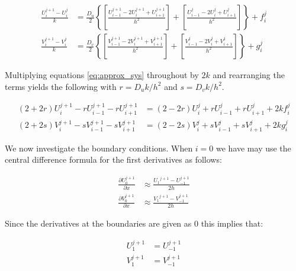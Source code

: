 \begin{subequations} \label{eq:approx_sys}
\begin{align}
    \frac{U_{i}^{j+1} - U_{i}^{j}}{k} &=
        \frac{D_u}{2} \left\{
            \left[ \frac{U_{i-1}^{j+1}-2U_{i}^{j+1}+U_{i+1}^{j+1}}{h^2} \right] +
            \left[ \frac{U_{i-1}^{j}-2U_{i}^{j}+U_{i+1}^{j}}{h^2} \right]
        \right\} + f_{i}^{j} \label{eq:approx_prey}
        \\
    \frac{V_{i}^{j+1} - V_{i}^{j}}{k} &=
        \frac{D_v}{2} \left\{
            \left[ \frac{V_{i-1}^{j+1}-2V_{i}^{j+1}+V_{i+1}^{j+1}}{h^2} \right] +
            \left[ \frac{V_{i-1}^{j}-2V_{i}^{j}+V_{i+1}^{j}}{h^2} \right]
        \right\} + g_{i}^{j} \label{eq:approx_pred}
\end{align}
\end{subequations}

Multiplying equations \eqref{eq:approx_sys} throughout by $2k$ and rearranging
the terms yields the following with $r = D_u k / h^2$ and $s = D_v k / h^2$.

\begin{subequations} \label{eq:rearranged_approx_sys}
\begin{align}
    (2+2r) U_{i}^{j+1} - r U_{i-1}^{j+1} - r U_{i+1}^{j+1} &=
        (2-2r) U_{i}^{j} + r U_{i-1}^{j} + r U_{i+1}^{j} + 2k f_{i}^{j}
        \\
    (2+2s) V_{i}^{j+1} - s V_{i-1}^{j+1} - s V_{i+1}^{j+1} &=
        (2-2s) V_{i}^{j} + s V_{i-1}^{j} + s V_{i+1}^{j} + 2k g_{i}^{j}
\end{align}
\end{subequations}


We now investigate the boundary conditions. When $i=0$ we have may use the
central difference formula for the first derivatives as follows:

\begin{subequations}
\begin{align}
    \frac{\partial U_{0}^{j+1}}{\partial x} &\approx \frac{{U_1}^{j+1} - U_{-1}^{j+1}}{2h} \\
    \frac{\partial V_{0}^{j+1}}{\partial x} &\approx \frac{{V_1}^{j+1} - V_{-1}^{j+1}}{2h}
\end{align}
\end{subequations}

Since the derivatives at the boundaries are given as 0 this implies that:

\begin{subequations}
\begin{align}
    U_{1}^{j+1} &= U_{-1}^{j+1} \\
    V_{1}^{j+1} &= V_{-1}^{j+1}
\end{align}
\end{subequations}

